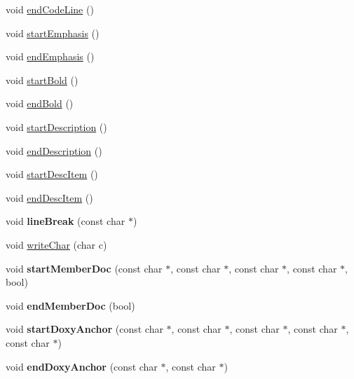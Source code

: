 \begin{DoxyCompactItemize}
\item 
void \hyperlink{class_man_generator_adbe51a89cf6f9573b3434e7cfda81a7c}{end\-Code\-Line} ()
\item 
void \hyperlink{class_man_generator_ab2f79d1f1a30e329f7ada3e51c04917e}{start\-Emphasis} ()
\item 
void \hyperlink{class_man_generator_a5c4adfb425dee0e192e5b606eab0114a}{end\-Emphasis} ()
\item 
void \hyperlink{class_man_generator_a6f230bea6c80b0a1847a9608c88fd45a}{start\-Bold} ()
\item 
void \hyperlink{class_man_generator_a1e1a209879148bfcb4b57ab294b37b90}{end\-Bold} ()
\item 
void \hyperlink{class_man_generator_ae87205938a124b2eac0d798631d4e5e6}{start\-Description} ()
\item 
void \hyperlink{class_man_generator_a5a0a6eb710a6b87c5dd8ea82b7a19dc4}{end\-Description} ()
\item 
void \hyperlink{class_man_generator_ab8a6797fe2e4cb968a4c13eea7c4c968}{start\-Desc\-Item} ()
\item 
void \hyperlink{class_man_generator_a080b8f2fa36e665da60bcfa982386ac8}{end\-Desc\-Item} ()
\item 
\hypertarget{class_man_generator_afb02437d493261127019c39243668d76}{void {\bfseries line\-Break} (const char $\ast$)}\label{class_man_generator_afb02437d493261127019c39243668d76}

\item 
void \hyperlink{class_man_generator_a0031a638b9159c2d16d2988da4b901ab}{write\-Char} (char c)
\item 
\hypertarget{class_man_generator_ad767ef57c71199afc7cd587b07bf36c8}{void {\bfseries start\-Member\-Doc} (const char $\ast$, const char $\ast$, const char $\ast$, const char $\ast$, bool)}\label{class_man_generator_ad767ef57c71199afc7cd587b07bf36c8}

\item 
\hypertarget{class_man_generator_ab4c60a384c219329e0dfd963e34336eb}{void {\bfseries end\-Member\-Doc} (bool)}\label{class_man_generator_ab4c60a384c219329e0dfd963e34336eb}

\item 
\hypertarget{class_man_generator_adbd5f10ab281c6d42fa535ae5834ee60}{void {\bfseries start\-Doxy\-Anchor} (const char $\ast$, const char $\ast$, const char $\ast$, const char $\ast$, const char $\ast$)}\label{class_man_generator_adbd5f10ab281c6d42fa535ae5834ee60}

\item 
\hypertarget{class_man_generator_acb8477967f0385b221e6adcc8c9cc67a}{void {\bfseries end\-Doxy\-Anchor} (const char $\ast$, const char $\ast$)}\label{class_man_generator_acb8477967f0385b221e6adcc8c9cc67a}


\end{DoxyCompactItemize}
